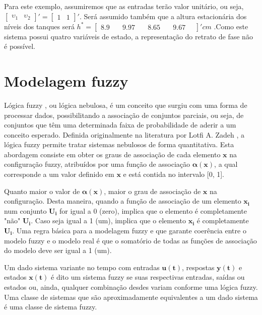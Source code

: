 Para este exemplo, assumiremos que as entradas terão valor unitário, ou seja, $\begin{bmatrix}\upsilon_1&\upsilon_2\end{bmatrix}' = \begin{bmatrix}1&1\end{bmatrix}'$. Será assumido também que a altura estacionária dos níveis dos tanques será $ h^* = \begin{bmatrix}8.9\quad&9.97\quad&8.65\quad&9.67\quad\end{bmatrix}' cm$ \cite{inproc:arthur:2015}.Como este sistema possui quatro variáveis de estado, a representação do retrato de fase não é possível.

\section{Modelagem fuzzy}\label{Modelo-fuzzy}

Lógica fuzzy \cite{techreport:seatle}, ou lógica nebulosa, é um conceito que surgiu com uma forma de processar dados, possibilitando a associação de conjuntos parciais, ou seja, de conjuntos que têm uma determinada faixa de probabilidade de aderir a um conceito esperado. Definida originalmente na literatura por Lotfi A. Zadeh \cite{article:zadeh:1990}, a lógica fuzzy permite tratar sistemas nebulosos de forma quantitativa. Esta abordagem consiste em obter os graus de associação de cada elemento $\mathbf{x}$ na configuração fuzzy, atribuídos por uma função de associação $\mathbf{\alpha(x)}$, a qual corresponde a um valor definido em $\mathbf{x}$ e está contida no intervalo [0, 1].

Quanto maior o valor de $\mathbf{\alpha(x)}$, maior o grau de associação de $\mathbf{x}$ na configuração. Desta maneira, quando a função de associação de um elemento $\mathbf{x_i}$ num conjunto $\mathbf{U_i}$ for igual a 0 (zero), implica que o elemento é completamente "não" $\mathbf{U_i}$. Caso seja igual a 1 (um), implica que o elemento $\mathbf{x_i}$ é completamente $\mathbf{U_i}$. Uma regra básica para a modelagem fuzzy e que garante coerência entre o modelo fuzzy e o modelo real é que o somatório de todas as funções de associação do modelo deve ser igual a 1 (um).

Um dado sistema variante no tempo com entradas $\mathbf{u(t)}$, respostas $\mathbf{y(t)}$ e estados $\mathbf{x(t)}$ é dito um sistema fuzzy \cite{article:zadeh:1990} se suas respectivas entradas, saídas ou estados ou, ainda, qualquer combinação desdes variam conforme uma lógica fuzzy. Uma classe de sistemas que são aproximadamente equivalentes a um dado sistema é uma classe de sistema fuzzy.

